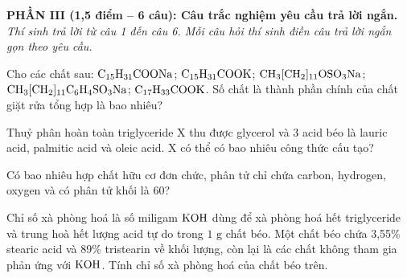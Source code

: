 \documentclass[12pt,a4paper]{article}
\begin{document}
\vspace{0.3cm}
\noindent
\textbf{PHẦN III (1,5 điểm -- 6 câu): Câu trắc nghiệm yêu cầu trả lời ngắn.}\\
\textit{Thí sinh trả lời từ câu 1 đến câu 6. Mỗi câu hỏi thí sinh điền câu trả lời ngắn gọn theo yêu cầu.}

\setcounter{ex}{0}

\begin{ex}
Cho các chất sau: $\ce{C15H31COONa}$; $\ce{C15H31COOK}$; $\ce{CH3[CH2]11OSO3Na}$; $\ce{CH3[CH2]11C6H4SO3Na}$; $\ce{C17H33COOK}$. Số chất là thành phần chính của chất giặt rửa tổng hợp là bao nhiêu?
\end{ex}

\begin{ex}
Thuỷ phân hoàn toàn triglyceride X thu được glycerol và 3 acid béo là lauric acid, palmitic acid và oleic acid. X có thể có bao nhiêu công thức cấu tạo?
\end{ex}

\begin{ex}
Có bao nhiêu hợp chất hữu cơ đơn chức, phân tử chỉ chứa carbon, hydrogen, oxygen và có phân tử khối là 60?
\end{ex}

\begin{ex}
Chỉ số xà phòng hoá là số miligam $\ce{KOH}$ dùng để xà phòng hoá hết triglyceride và trung hoà hết lượng acid tự do trong $1\text{ g}$ chất béo. Một chất béo chứa 3,55\% stearic acid và 89\% tristearin về khối lượng, còn lại là các chất không tham gia phản ứng với $\ce{KOH}$. Tính chỉ số xà phòng hoá của chất béo trên.
\end{ex}
\end{document}

